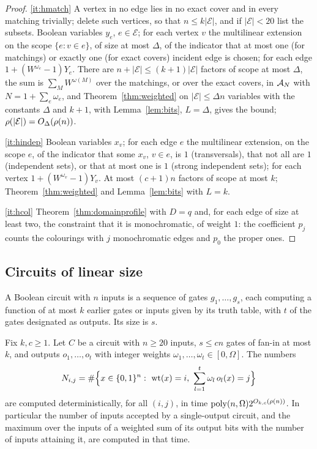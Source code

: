 \begin{proof}
\ref{it:hmatch} A vertex in no edge lies in no exact cover and in every matching
trivially; delete such vertices, so that $n\le k|\mathcal E|$, and if
$|\mathcal E|<20$ list the subsets. Boolean variables $y_e$, $e\in\mathcal E$;
for each vertex $v$ the multilinear extension on the scope
$\{e:v\in e\}$, of size at most $\Delta$, of the indicator that at most one
(for matchings) or exactly one (for exact covers) incident edge is chosen; for
each edge $1+(W^{\omega_e}-1)Y_e$. There are $n+|\mathcal E|\le(k+1)|\mathcal E|$
factors of scope at most $\Delta$, the sum is
$\sum_M W^{\omega(M)}$ over the matchings, or over the exact covers, in $\mathcal{A}_N$
with $N=1+\sum_e\omega_e$, and Theorem~\ref{thm:weighted} on $|\mathcal E|\le\Delta n$
variables with the constants $\Delta$ and $k+1$, with Lemma~\ref{lem:bits},
$L=\Delta$, gives the bound; $\rho(|\mathcal E|)=O_\Delta(\rho(n))$.

\ref{it:hindep} Boolean variables $x_v$; for each edge $e$ the multilinear
extension, on the scope $e$, of the indicator that some $x_v$, $v\in e$, is $1$
(transversals), that not all are $1$ (independent sets), or that at most one
is $1$ (strong independent sets); for each vertex $1+(W^{\omega_v}-1)Y_v$. At most
$(c+1)n$ factors of scope at most $k$; Theorem~\ref{thm:weighted} and
Lemma~\ref{lem:bits} with $L=k$.

\ref{it:hcol} Theorem~\ref{thm:domainprofile} with $D=q$ and, for each edge of
size at least two, the constraint that it is monochromatic, of weight $1$: the
coefficient $p_j$ counts the colourings with $j$ monochromatic edges and $p_0$
the proper ones.
\end{proof}

\subsection{Circuits of linear size}\label{ssec:circuits}
A Boolean circuit with $n$ inputs is a sequence of gates $g_1,\dots,g_s$, each
computing a function of at most $k$ earlier gates or inputs given by its truth
table, with $t$ of the gates designated as outputs. Its size is $s$.

\begin{theorem}\label{thm:circuits}
Fix $k,c\ge1$. Let $C$ be a circuit with $n\ge20$ inputs, $s\le cn$ gates of
fan-in at most $k$, and outputs $o_1,\dots,o_t$ with integer weights
$\omega_1,\dots,\omega_t\in[0,\Omega]$. The numbers
\[
  N_{i,j}=\#\Bigl\{x\in\{0,1\}^n:\ \operatorname{wt}(x)=i,\ \sum_{l=1}^{t}\omega_l\,o_l(x)=j\Bigr\}
\]
are computed deterministically, for all $(i,j)$, in time
$\operatorname{poly}(n,\Omega)2^{O_{k,c}(\rho(n))}$. In particular the number of inputs
accepted by a single-output circuit, and the maximum over the inputs of a
weighted sum of its output bits with the number of inputs attaining it, are
computed in that time.
\end{theorem}

